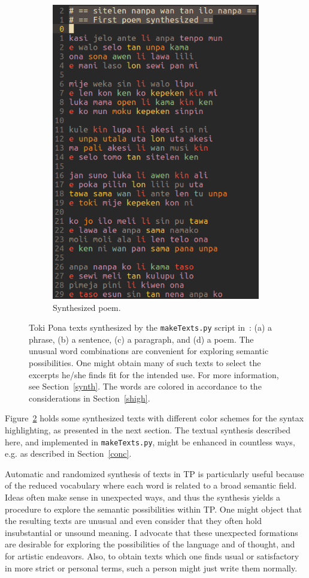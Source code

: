 \documentclass{article}
\newcommand{\tttt}[1]{\texttt{#1}}
\begin{document}
\begin{figure}
\begin{subfigure}{.7\textwidth}
        \includegraphics[width=.8\linewidth]{figs/poem_}\vspace{-0.15cm}
          \caption{Synthesized poem.}
            \label{fig:sfig2}
  \end{subfigure}
  \caption{Toki Pona texts synthesized by the \tttt{makeTexts.py} script
  in~\cite{tokipona}: (a) a phrase, (b) a sentence, (c) a paragraph,
  and (d) a poem.
  The unusual word combinations are convenient for exploring semantic
  possibilities.
  One might obtain many of such texts to select the excerpts
  he/she finds fit for the intended use.
  For more information, see Section~\ref{synth}.
  The words are colored in accordance to the considerations
  in Section~\ref{shigh}.}
  \label{fig:syn}
\end{figure}

Figure~\ref{fig:syn} holds some synthesized texts
with different color schemes for the syntax highlighting,
as presented in the next section.
The textual synthesis described here,
and implemented in \tttt{makeTexts.py},
might be enhanced in countless ways,
e.g. as described in Section~\ref{conc}.

Automatic and randomized synthesis of texts in TP is particularly
useful because of the reduced vocabulary where each word is related
to a broad semantic field.
Ideas often make sense in unexpected ways, and thus
the synthesis yields a procedure to 
explore the semantic possibilities within TP.
One might object that the resulting texts are unusual 
and even consider that they often hold insubstantial or unsound meaning.
I advocate that these unexpected formations are desirable
for exploring the possibilities of the language and of thought,
and for artistic endeavors.
Also, to obtain texts which one finds usual or satisfactory
in more strict or personal terms, such a person might just write
them normally.
\end{document}
